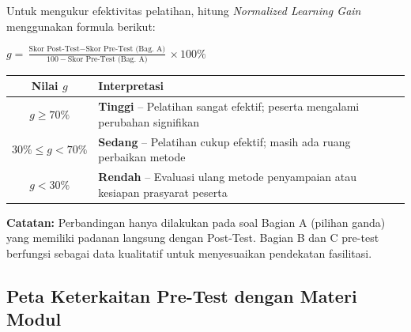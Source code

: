 \documentclass[12pt,a4paper]{report}
\begin{document}
\begin{plnbox}
\small
Untuk mengukur efektivitas pelatihan, hitung \textit{Normalized Learning Gain} menggunakan formula berikut:

\vspace{0.3cm}
\begin{center}
$\displaystyle g = \frac{\text{Skor Post-Test} - \text{Skor Pre-Test (Bag. A)}}{100 - \text{Skor Pre-Test (Bag. A)}} \times 100\%$
\end{center}

\vspace{0.3cm}
\renewcommand{\arraystretch}{1.3}
\begin{tabularx}{\textwidth}{@{} c X @{}}
\toprule
\textbf{Nilai $g$} & \textbf{Interpretasi} \\
\midrule
$g \geq 70\%$ & \textbf{Tinggi} -- Pelatihan sangat efektif; peserta mengalami perubahan signifikan \\
$30\% \leq g < 70\%$ & \textbf{Sedang} -- Pelatihan cukup efektif; masih ada ruang perbaikan metode \\
$g < 30\%$ & \textbf{Rendah} -- Evaluasi ulang metode penyampaian atau kesiapan prasyarat peserta \\
\bottomrule
\end{tabularx}
\renewcommand{\arraystretch}{1.0}

\vspace{0.3cm}
\textbf{Catatan:} Perbandingan hanya dilakukan pada soal Bagian A (pilihan ganda) yang memiliki padanan langsung dengan Post-Test. Bagian B dan C pre-test berfungsi sebagai data kualitatif untuk menyesuaikan pendekatan fasilitasi.
\end{plnbox}

\vspace{0.5cm}

\subsection{Peta Keterkaitan Pre-Test dengan Materi Modul}
\end{document}

